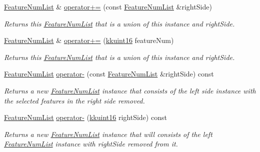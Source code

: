 \begin{DoxyCompactItemize}
\hyperlink{class_k_k_m_l_l_1_1_feature_num_list}{Feature\+Num\+List} \& \hyperlink{class_k_k_m_l_l_1_1_feature_num_list_a4015053c460a713821efc22b7a886b83}{operator+=} (const \hyperlink{class_k_k_m_l_l_1_1_feature_num_list}{Feature\+Num\+List} \&right\+Side)
\begin{DoxyCompactList}\small\item\em Returns this \hyperlink{class_k_k_m_l_l_1_1_feature_num_list}{Feature\+Num\+List} that is a union of this instance and \textquotesingle{}right\+Side\textquotesingle{}. \end{DoxyCompactList}\item 
\hyperlink{class_k_k_m_l_l_1_1_feature_num_list}{Feature\+Num\+List} \& \hyperlink{class_k_k_m_l_l_1_1_feature_num_list_a21ec2348cfbecdc58e79983dd8431591}{operator+=} (\hyperlink{namespace_k_k_b_aa8c7d4d30381c8a0b6fce68974a9c8a9}{kkuint16} feature\+Num)
\begin{DoxyCompactList}\small\item\em Returns this \hyperlink{class_k_k_m_l_l_1_1_feature_num_list}{Feature\+Num\+List} that is a union of this instance and \textquotesingle{}right\+Side\textquotesingle{}. \end{DoxyCompactList}\item 
\hyperlink{class_k_k_m_l_l_1_1_feature_num_list}{Feature\+Num\+List} \hyperlink{class_k_k_m_l_l_1_1_feature_num_list_a7957746c6d267b22347d7c7b4df59531}{operator-\/} (const \hyperlink{class_k_k_m_l_l_1_1_feature_num_list}{Feature\+Num\+List} \&right\+Side) const 
\begin{DoxyCompactList}\small\item\em Returns a new \hyperlink{class_k_k_m_l_l_1_1_feature_num_list}{Feature\+Num\+List} instance that consists of the left side instance with the selected features in the right side removed. \end{DoxyCompactList}\item 
\hyperlink{class_k_k_m_l_l_1_1_feature_num_list}{Feature\+Num\+List} \hyperlink{class_k_k_m_l_l_1_1_feature_num_list_a475829b9e8895bd397b5375b4fa5170c}{operator-\/} (\hyperlink{namespace_k_k_b_aa8c7d4d30381c8a0b6fce68974a9c8a9}{kkuint16} right\+Side) const 
\begin{DoxyCompactList}\small\item\em Returns a new \hyperlink{class_k_k_m_l_l_1_1_feature_num_list}{Feature\+Num\+List} instance that will consists of the left \hyperlink{class_k_k_m_l_l_1_1_feature_num_list}{Feature\+Num\+List} instance with \textquotesingle{}right\+Side\textquotesingle{} removed from it. \end{DoxyCompactList}\item 

\end{DoxyCompactItemize}
